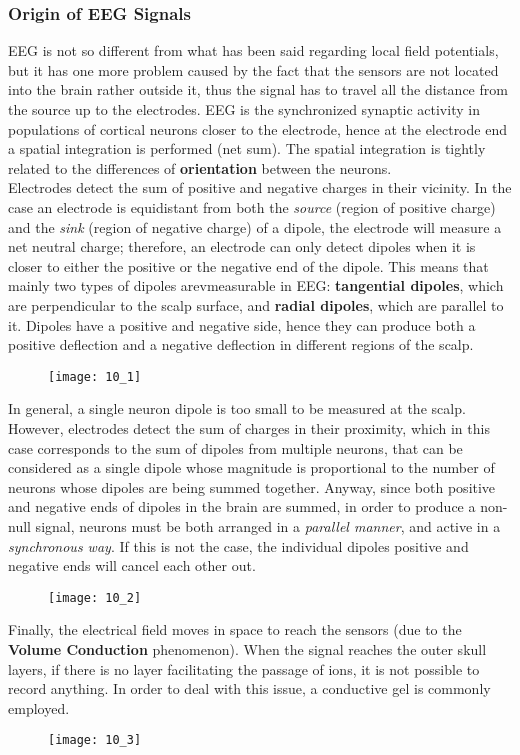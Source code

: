 \subsubsection{Origin of EEG Signals}
EEG is not so different from what has been said regarding local field potentials, but it has
one more problem caused by the fact that the sensors are not located into the brain rather
outside it, thus the signal has to travel all the distance from the source up to the
electrodes. EEG is the synchronized synaptic activity in populations of cortical neurons
closer to the electrode, hence at the electrode end a spatial integration is performed (net
sum). The spatial integration is tightly related to the differences of \textbf{orientation}
between the neurons.\\
Electrodes detect the sum of positive and negative charges in their vicinity. In the case
an electrode is equidistant from both the \textit{source} (region of positive charge) and the
\textit{sink} (region of negative charge) of a dipole, the electrode will measure a net
neutral charge; therefore, an electrode can only detect dipoles when it is closer to either
the positive or the negative end of the dipole. This means that mainly two types of dipoles
arevmeasurable in EEG: \textbf{tangential dipoles}, which are perpendicular to the scalp
surface, and \textbf{radial dipoles}, which are parallel to it. Dipoles have a positive and
negative side, hence they can produce both a positive deflection and a negative deflection
in different regions of the scalp.
\begin{figure}[H]
    \texttt{[image: 10\_1]}
    \centering
\end{figure}
In general, a single neuron dipole is too small to be measured at the scalp. However,
electrodes detect the sum of charges in their proximity, which in this case corresponds to
the sum of dipoles from multiple neurons, that can be considered as a single dipole whose
magnitude is proportional to the number of neurons whose dipoles are being summed together.
Anyway, since both positive and negative ends of dipoles in the brain are summed, in order to
produce a non-null signal, neurons must be both arranged in a \textit{parallel manner}, and
active in a \textit{synchronous way}. If this is not the case, the individual dipoles
positive and negative ends will cancel each other out.
\begin{figure}[H]
    \texttt{[image: 10\_2]}
    \centering
\end{figure}
Finally, the electrical field moves in space to reach the sensors (due to the
\textbf{Volume Conduction} phenomenon). When the signal reaches the outer skull layers, if
there is no layer facilitating the passage of ions, it is not possible to record anything.
In order to deal with this issue, a conductive gel is commonly employed.
\begin{figure}[H]
    \texttt{[image: 10\_3]}
    \centering
\end{figure}
